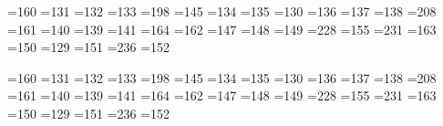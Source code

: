 
=160	%
=131	%
=132	%
=133	%
=198	%
=145	%
=134	%
=135	%
=130	%
=136	%
=137	%
=138	%
=208	%
=161	%
=140	%
=139	%
=141	%
=164	%
=162	%
=147	%
=148	%
=149	%
=228	%
=155	%
=231	%
=163	%
=150	%
=129	%
=151	%
=236	%
=152	%

=160	%
=131	%
=132	%
=133	%
=198	%
=145	%
=134	%
=135	%
=130	%
=136	%
=137	%
=138	%
=208	%
=161	%
=140	%
=139	%
=141	%
=164	%
=162	%
=147	%
=148	%
=149	%
=228	%
=155	%
=231	%
=163	%
=150	%
=129	%
=151	%
=236	%
=152	%

